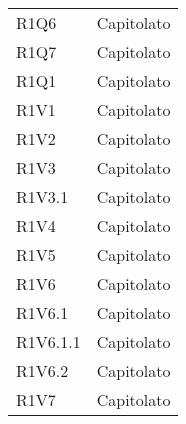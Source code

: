 \begin{longtable}{|C{6.5cm}|C{6.5cm}|}
	R1Q6 & Capitolato \\
					
	R1Q7 & Capitolato \\
						
	R1Q1 & Capitolato \\
	
	R1V1 & Capitolato \\
	
	R1V2 & Capitolato \\
	
	R1V3 & Capitolato \\
	
	R1V3.1 & Capitolato \\
	
	R1V4 & Capitolato \\
	
	R1V5 & Capitolato \\
	
	R1V6 & Capitolato \\
	
	R1V6.1 & Capitolato \\
	
	R1V6.1.1 & Capitolato \\
	
	R1V6.2 & Capitolato \\
	
	R1V7 & Capitolato \\
	
	\hline
	
\end{longtable}